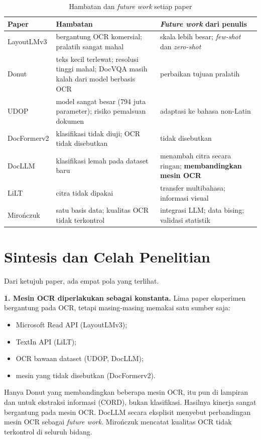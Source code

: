 \begin{table}[H]
  \centering
  \caption{Hambatan dan \textit{future work} setiap paper}
  \label{tab:hambatan}
  \fontsize{9}{11}\selectfont
  \begin{tabularx}{\textwidth}{|l|>{\raggedright\arraybackslash}X|>{\raggedright\arraybackslash}X|}
    \hline
    \textbf{Paper} & \textbf{Hambatan} & \textbf{\textit{Future work} dari penulis} \\ \hline
    LayoutLMv3 & bergantung OCR komersial; pralatih sangat mahal &
    skala lebih besar; \textit{few-shot} dan \textit{zero-shot} \\ \hline
    Donut & teks kecil terlewat; resolusi tinggi mahal; DocVQA masih kalah dari model
    berbasis OCR & perbaikan tujuan pralatih \\ \hline
    UDOP & model sangat besar (794 juta parameter); risiko pemalsuan dokumen &
    adaptasi ke bahasa non-Latin \\ \hline
    DocFormerv2 & klasifikasi tidak diuji; OCR tidak disebutkan & tidak disebutkan \\ \hline
    DocLLM & klasifikasi lemah pada dataset baru & menambah citra secara ringan;
    \textbf{membandingkan mesin OCR} \\ \hline
    LiLT & citra tidak dipakai & transfer multibahasa; informasi visual \\ \hline
    Mirończuk & satu basis data; kualitas OCR tidak terkontrol & integrasi LLM;
    data bising; validasi statistik \\ \hline
  \end{tabularx}
\end{table}

\section{Sintesis dan Celah Penelitian}\label{sec:sintesis}

Dari ketujuh paper, ada empat pola yang terlihat.

\textbf{1. Mesin OCR diperlakukan sebagai konstanta.} Lima paper eksperimen bergantung pada
OCR, tetapi masing-masing memakai satu sumber saja:
\begin{itemize}
  \item Microsoft Read API (LayoutLMv3);
  \item TextIn API (LiLT);
  \item OCR bawaan dataset (UDOP, DocLLM);
  \item mesin yang tidak disebutkan (DocFormerv2).
\end{itemize}
Hanya Donut yang membandingkan beberapa mesin OCR, itu pun di lampiran dan untuk ekstraksi
informasi (CORD), bukan klasifikasi. Hasilnya kinerja sangat bergantung pada mesin OCR.
DocLLM secara eksplisit menyebut perbandingan mesin OCR sebagai \textit{future work}.
Mirończuk mencatat kualitas OCR tidak terkontrol di seluruh bidang.

